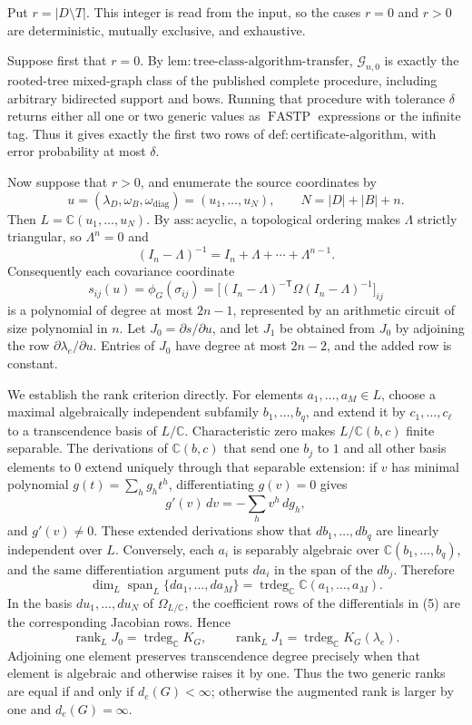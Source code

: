 Put \(r=|D\setminus T|\).  This integer is read from the input, so the cases \(r=0\) and \(r>0\) are deterministic, mutually exclusive, and exhaustive.

Suppose first that \(r=0\).  By \(\mathrm{lem:tree\mbox{-}class\mbox{-}algorithm\mbox{-}transfer}\), \(\mathcal G_{n,0}\) is exactly the rooted-tree mixed-graph class of the published complete procedure, including arbitrary bidirected support and bows.  Running that procedure with tolerance \(\delta\) returns either all one or two generic values as \(\operatorname{FASTP}\) expressions or the infinite tag.  Thus it gives exactly the first two rows of \(\mathrm{def:certificate\mbox{-}algorithm}\), with error probability at most \(\delta\).

Now suppose that \(r>0\), and enumerate the source coordinates by
\[
 u=(\lambda_D,\omega_B,\omega_{\mathrm{diag}})=(u_1,\ldots,u_N),
 \qquad N=|D|+|B|+n.
\tag{1}
\]
Then \(L=\mathbb C(u_1,\ldots,u_N)\).  By \(\mathrm{ass:acyclic}\), a topological ordering makes \(\Lambda\) strictly triangular, so \(\Lambda^n=0\) and
\[
 (I_n-\Lambda)^{-1}=I_n+\Lambda+\cdots+\Lambda^{n-1}.
\tag{2}
\]
Consequently each covariance coordinate
\[
 s_{ij}(u)=\phi_G(\sigma_{ij})
 =\bigl[(I_n-\Lambda)^{-\mathsf T}\Omega(I_n-\Lambda)^{-1}\bigr]_{ij}
\tag{3}
\]
is a polynomial of degree at most \(2n-1\), represented by an arithmetic circuit of size polynomial in \(n\).  Let \(J_0=\partial s/\partial u\), and let \(J_1\) be obtained from \(J_0\) by adjoining the row \(\partial\lambda_e/\partial u\).  Entries of \(J_0\) have degree at most \(2n-2\), and the added row is constant.

We establish the rank criterion directly.  For elements \(a_1,\ldots,a_M\in L\), choose a maximal algebraically independent subfamily \(b_1,\ldots,b_q\), and extend it by \(c_1,\ldots,c_\ell\) to a transcendence basis of \(L/\mathbb C\).  Characteristic zero makes \(L/\mathbb C(b,c)\) finite separable.  The derivations of \(\mathbb C(b,c)\) that send one \(b_j\) to \(1\) and all other basis elements to \(0\) extend uniquely through that separable extension: if \(v\) has minimal polynomial \(g(t)=\sum_h g_h t^h\), differentiating \(g(v)=0\) gives
\[
 g'(v)\,dv=-\sum_h v^h\,dg_h,
\tag{4}
\]
and \(g'(v)\ne0\).  These extended derivations show that \(db_1,\ldots,db_q\) are linearly independent over \(L\).  Conversely, each \(a_i\) is separably algebraic over \(\mathbb C(b_1,\ldots,b_q)\), and the same differentiation argument puts \(da_i\) in the span of the \(db_j\).  Therefore
\[
 \dim_L\operatorname{span}_L\{da_1,\ldots,da_M\}
 =\operatorname{trdeg}_{\mathbb C}\mathbb C(a_1,\ldots,a_M).
\tag{5}
\]
In the basis \(du_1,\ldots,du_N\) of \(\Omega_{L/\mathbb C}\), the coefficient rows of the differentials in (5) are the corresponding Jacobian rows.  Hence
\[
 \operatorname{rank}_L J_0=\operatorname{trdeg}_{\mathbb C}K_G,
 \qquad
 \operatorname{rank}_L J_1=\operatorname{trdeg}_{\mathbb C}K_G(\lambda_e).
\tag{6}
\]
Adjoining one element preserves transcendence degree precisely when that element is algebraic and otherwise raises it by one.  Thus the two generic ranks are equal if and only if \(d_e(G)<\infty\); otherwise the augmented rank is larger by one and \(d_e(G)=\infty\).

